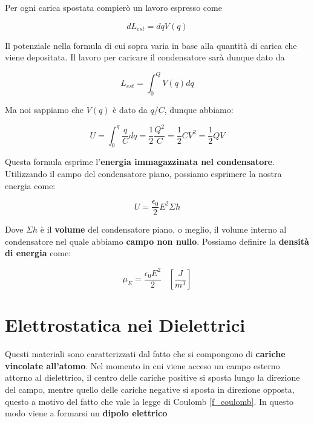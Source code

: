 Per ogni carica spostata compierò un lavoro espresso come

$$
dL_{est} = dqV(q)
$$

Il potenziale nella formula di cui sopra varia in base alla quantità di carica che viene depositata. Il lavoro per caricare il condensatore sarà dunque dato da

\begin{large}
	\begin{equation}
		L_{est} = \int_{0}^{Q} V(q) dq
	\end{equation}
\end{large}

Ma noi sappiamo che $V(q)$ è dato da $q/C$, dunque abbiamo: 

\begin{large}
	\begin{equation}
		U = \int_{0}^{q}\frac{q}{C} dq = \frac{1}{2} \frac{Q^2}{C} = \frac{1}{2} CV^2= \frac{1}{2} QV
	\end{equation}
\end{large}

Questa formula esprime l'\textbf{energia immagazzinata nel condensatore}. Utilizzando il campo del condensatore piano, possiamo esprimere la nostra energia come: 

\begin{large}
	\begin{equation}
		U = \frac{\epsilon_0}{2} E^2 \Sigma h
	\end{equation}
\end{large}

Dove $\Sigma h$ è il \textbf{volume} del condensatore piano, o meglio, il volume interno al condensatore nel quale abbiamo \textbf{campo non nullo}. Possiamo definire la \textbf{densità di energia} come: 

\begin{large}
	\begin{equation} \label{eq_densita_energia}
		\mu_E = \frac{\epsilon_0 E^2}{2} \;\;\;  \left[  \frac{J}{m^3} \right]
	\end{equation}
\end{large}

\section{Elettrostatica nei Dielettrici}

Questi materiali sono caratterizzati dal fatto che si compongono di \textbf{cariche vincolate all'atomo}. Nel momento in cui viene acceso un campo esterno attorno al dielettrico, il centro delle cariche positive si sposta lungo la direzione del campo, mentre quello delle cariche negative si sposta in direzione opposta, questo a motivo del fatto che vale la legge di Coulomb \ref{f_coulomb}. In questo modo viene a formarsi un \textbf{dipolo elettrico}

